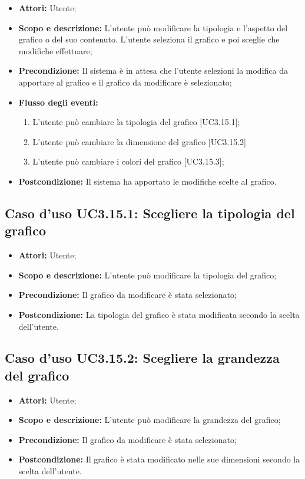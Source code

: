 \begin{itemize}
	\item \textbf{Attori:} Utente;
	\item \textbf{Scopo e descrizione:} L'utente può modificare la tipologia e l'aspetto del grafico o del suo contenuto. L'utente seleziona il grafico e poi sceglie che modifiche effettuare;
	\item \textbf{Precondizione:} Il sistema è in attesa che l'utente selezioni la modifica da apportare al grafico e il grafico da modificare è selezionato;
	\item \textbf{Flusso degli eventi:}
	\begin{enumerate}
		\item L'utente può cambiare la tipologia del grafico [UC3.15.1];
		\item L'utente può cambiare la dimensione del grafico [UC3.15.2]
		\item L'utente può cambiare i colori del grafico [UC3.15.3];
	\end{enumerate}
	\item \textbf{Postcondizione:} Il sistema ha apportato le modifiche scelte al grafico.
\end{itemize}

\subsection{Caso d'uso UC3.15.1: Scegliere la tipologia del grafico}
\begin{itemize}
	\item \textbf{Attori:} Utente;
	\item \textbf{Scopo e descrizione:} L'utente può modificare la tipologia del grafico;
	\item \textbf{Precondizione:} Il grafico da modificare è stata selezionato;
	\item \textbf{Postcondizione:} La tipologia del grafico è stata modificata secondo la scelta dell'utente.
\end{itemize}

\subsection{Caso d'uso UC3.15.2: Scegliere la grandezza del grafico}
\begin{itemize}
	\item \textbf{Attori:} Utente;
	\item \textbf{Scopo e descrizione:} L'utente può modificare la grandezza del grafico;
	\item \textbf{Precondizione:} Il grafico da modificare è stata selezionato;
	\item \textbf{Postcondizione:} Il grafico è stata modificato nelle sue dimensioni secondo la scelta dell'utente.
\end{itemize}

